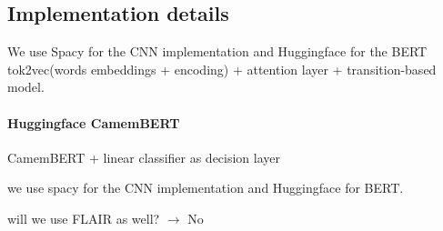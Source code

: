 \subsection{Implementation details}
We use Spacy for the CNN implementation
and Huggingface for the BERT 
tok2vec(words embeddings + encoding) + attention layer  +  transition-based model.

\paragraph{Huggingface CamemBERT}
CamemBERT + linear classifier as decision layer



we use spacy  for the CNN implementation and Huggingface for BERT.

will we use FLAIR as well? $\rightarrow$ No